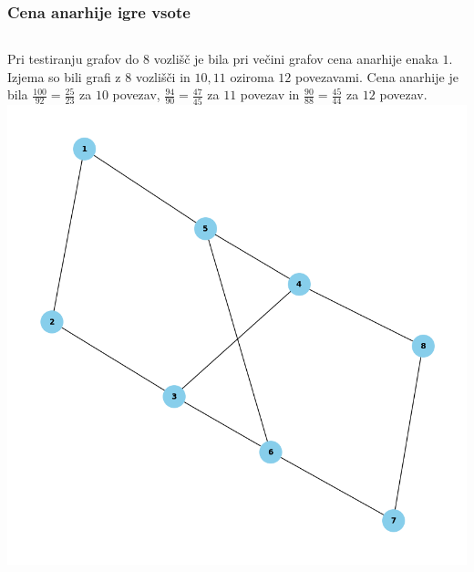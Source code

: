 \documentclass[12pt, hyperref={unicode}]{beamer}
\begin{document}
\begin{frame}
  
  \frametitle{Cena anarhije igre vsote}
  \begin{columns}
    Pri testiranju grafov do $8$ vozlišč je bila pri večini grafov cena anarhije enaka $1$.
    Izjema so bili grafi z $8$ vozlišči in $10, 11 $ oziroma $12$ povezavami. Cena anarhije je bila
    $\frac{100}{92} = \frac{25}{23}$ za $10$ povezav, $\frac{94}{90} = \frac{47}{45}$ za $11$ povezav
    in $\frac{90}{88} = \frac{45}{44}$  za $12$ povezav.
    \includegraphics[width=1\textwidth]{8_10_najslabsi.png}
  \end{columns}
  
\end{frame}

\end{document}
